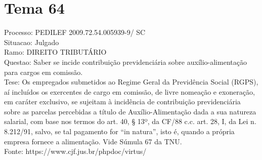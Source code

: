 \documentclass[12pt]{article}
\begin{document}
\section*{Tema 64}
Processo: PEDILEF 2009.72.54.005939-9/ SC\\
Situacao: Julgado\\
Ramo: DIREITO TRIBUTÁRIO\\
Questao: Saber se incide contribuição previdenciária sobre auxílio-alimentação para cargos em comissão.\\
Tese: Os empregados submetidos ao Regime Geral da Previdência Social (RGPS), aí incluídos os exercentes de cargo em comissão, de livre nomeação e exoneração, em caráter exclusivo, se sujeitam à incidência de contribuição previdenciária sobre as parcelas percebidas a título de Auxílio-Alimentação dada a sua natureza salarial, com base nos termos do art. 40, § 13º, da CF/88 c.c. art. 28, I, da Lei n. 8.212/91, salvo, se tal pagamento for “in natura”, isto é, quando a própria empresa fornece a alimentação. Vide Súmula 67 da TNU.\\
Fonte: https://www.cjf.jus.br/phpdoc/virtus/
\end{document}
